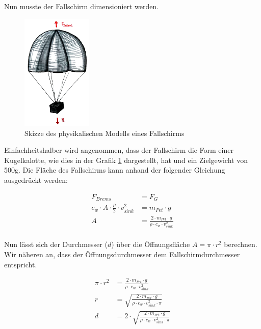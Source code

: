 Nun musste der Fallschirm dimensioniert werden. 
\begin{figure}[H]
	\centering
	\includegraphics[width=0.3\textwidth] {images/fallschirm_berechnung.png} 
	\caption{Skizze des physikalischen Modells eines Fallschirms}
	\label{fig:fallschirm-berechnung}
\end{figure}
Einfachheitshalber wird angenommen, dass der Fallschirm die Form einer Kugelkalotte, wie dies in der Grafik \ref{fig:fallschirm-berechnung} dargestellt, hat und ein Zielgewicht von 500g. Die Fläche des Fallschirms kann anhand der folgender Gleichung ausgedrückt werden:


\begin{equation}
\begin{split}
F_{Brems} &= F_{G} \\
c_{w} \cdot A \cdot \frac{\rho}{2} \cdot v_{sink}^{2} &= m_{Pet} \cdot g \\
A &= \frac{2 \cdot m_{Pet} \cdot g}{\rho \cdot c_{w} \cdot v_{sink}^{2} } \\
\end{split}
\end{equation}

Nun lässt sich der Durchmesser ($d$) über die Öffnungsfläche $A = \pi \cdot r^2$ berechnen. Wir näheren an, dass der Öffnungsdurchmesser dem Fallschirmdurchmesser entspricht. 

\begin{equation}
\begin{split}
\pi \cdot r^2 &= \frac{2 \cdot m_{Pet} \cdot g}{\rho \cdot c_{w} \cdot v_{sink}^{2} } \\
r &= \sqrt{\frac{2 \cdot m_{Pet} \cdot g}{\rho \cdot c_{w} \cdot v_{sink}^{2} \cdot \pi}} \\
d &= 2 \cdot \sqrt{\frac{2 \cdot m_{Pet} \cdot g}{\rho \cdot c_{w} \cdot v_{sink}^{2} \cdot \pi}} \\
\end{split}
\end{equation}


